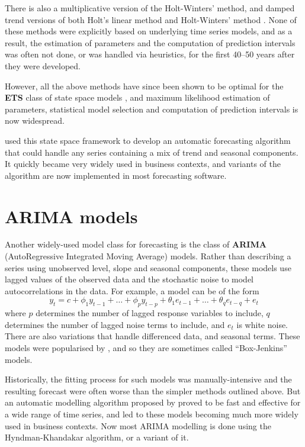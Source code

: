 \documentclass[a4paper,10pt]{article}
\begin{document}
There is also a multiplicative version of the Holt-Winters' method, and damped trend versions of both Holt's linear method and Holt-Winters' method \citep{fpp3}. None of these methods were explicitly based on underlying time series models, and as a result, the estimation of parameters and the computation of prediction intervals was often not done, or was handled via heuristics, for the first 40--50 years after they were developed.

However, all the above methods have since been shown to be optimal for the \textbf{ETS} class of state space models \citep{expsmooth08}, and maximum likelihood estimation of parameters, statistical model selection and computation of prediction intervals is now widespread.

\citet{HKSG02} used this state space framework to develop an automatic forecasting algorithm that could handle any series containing a mix of trend and seasonal components. It quickly became very widely used in business contexts, and variants of the algorithm are now implemented in most forecasting software.

\section{ARIMA models}

Another widely-used model class for forecasting is the class of \textbf{ARIMA} (AutoRegressive Integrated Moving Average) models. Rather than describing a series using unobserved level, slope and seasonal components, these models use lagged values of the observed data and the stochastic noise to model autocorrelations in the data. For example, a model can be of the form
$$y_t = c + \phi_1y_{t-1} + \dots + \phi_py_{t-p} + \theta_1e_{t-1} + \dots + \theta_qe_{t-q} + e_t$$
where $p$ determines the number of lagged response variables to include, $q$ determines the number of lagged noise terms to include, and $e_t$ is white noise. There are also variations that handle differenced data, and seasonal terms. These models were popularised by \citet{BJ70}, and so they are sometimes called ``Box-Jenkins'' models.

Historically, the fitting process for such models was manually-intensive and the resulting forecast were often worse than the simpler methods outlined above. But an automatic modelling algorithm proposed by \citet{HK08} proved to be fast and effective for a wide range of time series, and led to these models becoming much more widely used in business contexts. Now most ARIMA modelling is done using the Hyndman-Khandakar algorithm, or a variant of it.
\end{document}
